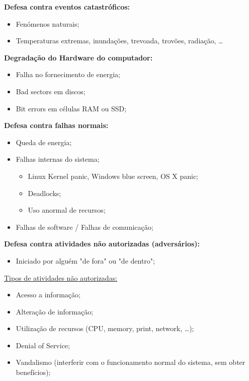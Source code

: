 \documentclass{article}
\begin{document}
\begin{flushleft}
  \textbf{Defesa contra eventos catastróficos:}
  \begin{itemize}
    \item Fenómenos naturais;
    \item Temperaturas extremas, inundações, trevoada, trovões, radiação, \dots
  \end{itemize}

  \textbf{Degradação do Hardware do computador:}
  \begin{itemize}
    \item Falha no fornecimento de energia;
    \item Bad sectors em discos;
    \item Bit errors em células RAM ou SSD;
  \end{itemize}

  \textbf{Defesa contra falhas normais:}
  \begin{itemize}
    \item Queda de energia;
    \item Falhas internas do sistema;
    \begin{itemize}
      \item Linux Kernel panic, Windows blue screen, OS X panic;
      \item Deadlocks;
      \item Uso anormal de recursos;
    \end{itemize}
    \item Falhas de software / Falhas de comunicação; 
  \end{itemize}

  \pagebreak

  \textbf{Defesa contra atividades não autorizadas (adversários):}
  \begin{itemize}
    \item Iniciado por alguém "de fora" ou "de dentro";
  \end{itemize}

  \uline{Tipos de atividades não autorizadas:}
  \begin{itemize}
    \item Acesso a informação;
    \item Alteração de informação;
    \item Utilização de recursos (CPU, memory, print, network, \dots);
    \item Denial of Service;
    \item Vandalismo (interferir com o funcionamento normal do sistema,
    sem obter benefícios);
  \end{itemize}
\end{flushleft}
\end{document}
